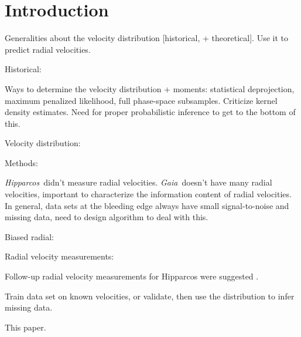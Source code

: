 \documentclass[12pt,preprint]{aastex}
\newcommand{\Hipparcos}{\textit{Hipparcos}}
\newcommand{\Gaia}{\textit{Gaia}}
\begin{document}
\section{Introduction}


Generalities about the velocity distribution [historical, +
theoretical]. Use it to predict radial velocities.

Historical:
\citep{schwarzschild07a,
proctor69a,
1890AN....125...65K,
kapteyn05a,
1906MNRAS..67...34E,
boss08a,
1965gast.conf..111E,
1996AJ....112.1595E,
1996AJ....111.1615E}

Ways to determine the velocity distribution + moments: statistical
deprojection, maximum penalized likelihood, full phase-space
subsamples. Criticize kernel density estimates. Need for proper
probabilistic inference to get to the bottom of this.


Velocity distribution:
\citep{1998A&A...340..384C,
1999A&AS..135....5C,
1998MNRAS.298..387D,
1998AJ....115.2384D,
2005A&A...430..165F,
1999MNRAS.308..731S,
2008A&A...490..135A,
2005ApJ...629..268H}

Methods:
\citep{1990A&A...227..301S,Silverman86a,1996A&AS..117..405L}




\Hipparcos\ didn't measure radial velocities. \Gaia\ doesn't have many
radial velocities, important to characterize the information content
of radial velocities. In general, data sets at the bleeding edge
always have small signal-to-noise and missing data, need to design
algorithm to deal with this.

\citep{ESA97a}

Biased radial: \citep{1997ESASP.402..473B}

Radial velocity measurements:
\citep{1999A&AS..137..451G,
1999A&AS..135..503G,
1997A&AS..124..255F,
1995A&AS..114..269D,
1995A&AS..110..177D,
2006ARep...50..733B,
2000A&AS..142..217B}


Follow-up radial velocity measurements for Hipparcos were suggested
\citep{1989Msngr..56...12G}.

Train data set on known velocities, or validate, then use the
distribution to infer missing data. 

This paper.
\end{document}
